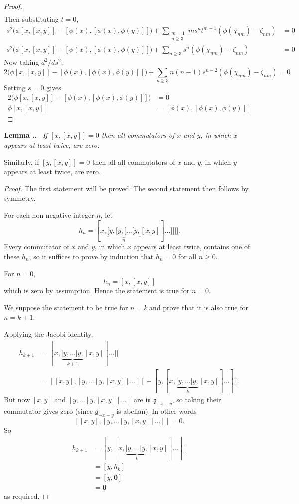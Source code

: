 \documentclass[honours]{UNSWthesis}
\newcommand{\g}{\mathfrak{g}}
\newcommand{\1}{\mathbf{e}_{1}}
\newcommand{\2}{\mathbf{e}_{3}}
\newcommand{\3}{\mathbf{e}_{3}}
\newcounter{Item}[section]
\newenvironment{Lemma}{\medskip
                            \refstepcounter{Item}
                            \noindent
                           {\bf Lemma \thesection.\theItem.}\ %
                            \begingroup \sl}
                           {\endgroup\medskip}
\begin{document}
\begin{proof}
\begin{align*}
\end{align*}
Then substituting $t=0$, 
\begin{align*}
s^{2}\big(\phi[x,[x,y]]-[\phi(x),[\phi(x),\phi(y)]]\big)+\sum\limits_{\substack{m=1\\ n \geq 3}}m s^{n}t^{m-1}(\phi(\chi_{nm})- \zeta_{nm})&=0 \\
s^{2}\big(\phi[x,[x,y]]-[\phi(x),[\phi(x),\phi(y)]]\big)+\sum\limits_{n \geq 3} s^{n}(\phi(\chi_{nm})- \zeta_{nm})&=0
\end{align*}
Now taking $d^{2}/ds^{2}$, 
\[
2\big(\phi[x,[x,y]]-[\phi(x),[\phi(x),\phi(y)]]\big)+\sum\limits_{n \geq 3} n(n-1)s^{n-2}(\phi(\chi_{nm})- \zeta_{nm})=0
\]
Setting $s=0$ gives
\begin{align*}
2\big(\phi[x,[x,y]]-[\phi(x),[\phi(x),\phi(y)]]\big)&=0 \\
\phi[x,[x,y]] &= [\phi(x),[\phi(x),\phi(y)]]
\end{align*}

\end{proof}



\begin{Lemma}\label{Two x's}
If $[x,[x,y]]=0 $ then all commutators of $x$ and $y$, in which $x$ appears at least twice, are zero.

Similarly, if $[y,[x,y]]=0$ then all all commutators of $x$ and $y$, in which $y$ appears at least twice, are zero.
\end{Lemma}

\begin{proof}
The first statement will be proved. The second statement then follows by symmetry.

For each non-negative integer $n$, let 
\[
h_n = [x,\underbrace{[y,[y,[\ldots[y,}_{n}[x,y]]\ldots]]]].
\]
Every commutator of $x$ and $y$, in which $x$ appears at least twice, contains one of these $h_n$, so it suffices to prove by induction that $h_n=0$ for all $n \geq 0$. 

For $n=0$, 
\[
h_n=[x,[x,y]]
\]
which is zero by assumption. Hence the statement is true for $n=0$.

We suppose the statement to be true for $n=k$ and prove that it is also true for $n=k+1$. 

Applying the Jacobi identity,
\begin{align*}
h_{k+1} &= [x,\underbrace{[y,\ldots[y,}_{k+1}[x,y]]\ldots]] \\
&= [[x,y],[y,\ldots[y,[x,y]]\ldots ]] + [y,[x,\underbrace{[y,\ldots[y,}_{k}[x,y]]\ldots]]].
\end{align*}
But now $[x,y]$ and $[y,\ldots[y,[x,y]]\ldots ]$ are in $\g_{-x-y}$, so taking their commutator gives zero (since $\g_{-x-y}$ is abelian). In other words 
\[
[[x,y],[y,\ldots[y,[x,y]]\ldots ]]=0.
\]
So  
\begin{align*}
h_{k+1} &=[y,[x,\underbrace{[y,\ldots[y,}_{k}[x,y]]\ldots]]] \\
&= [y,h_k] \\
&=[y,\mathbf{0}] \\
&= \mathbf{0}
\end{align*}
as required.
\end{proof}
\end{document}
